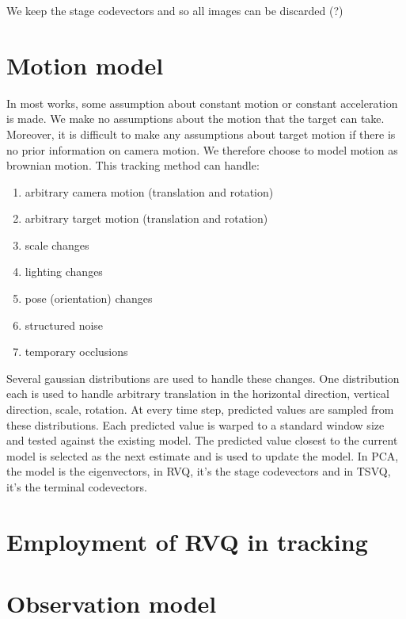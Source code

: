 \documentclass[12pt,letterpaper,doublespaced,ETD]{gt-ece-thesis} %
\begin{document}
\begin{Body}
We keep the stage codevectors and so all images can be discarded (?)

\section{Motion model}
In most works, some assumption about constant motion or constant acceleration is made.  We make no assumptions about the motion that the target can take.  Moreover, it is difficult to make any assumptions about target motion if there is no prior information on camera motion.  We therefore choose to model motion as brownian motion.  This tracking method can handle:

\begin{enumerate}
\item arbitrary camera motion (translation and rotation)
\item arbitrary target motion (translation and rotation)
\item scale changes
\item lighting changes
\item pose (orientation) changes
\item structured noise
\item temporary occlusions
\end{enumerate}

Several gaussian distributions are used to handle these changes.  One distribution each is used to handle arbitrary translation in the horizontal direction, vertical direction, scale, rotation.  At every time step, predicted values are sampled from these distributions.  Each predicted value is warped to a standard window size and tested against the existing model.  The predicted value closest to the current model is selected as the next estimate and is used to update the model.  In PCA, the model is the eigenvectors, in RVQ, it's the stage codevectors and in TSVQ, it's the terminal codevectors.  


\newpage
\section{Employment of RVQ in tracking}


\newpage
\section{Observation model}


\end{Body}
\end{document}
